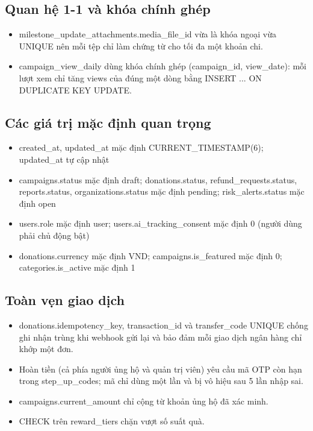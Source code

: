 \subsection{Quan hệ 1-1 và khóa chính ghép}

\begin{itemize}
    \item milestone\_\allowbreak{}update\_\allowbreak{}attachments.media\_\allowbreak{}file\_\allowbreak{}id vừa là khóa ngoại vừa UNIQUE nên mỗi tệp chỉ làm chứng từ cho tối đa một khoản chi.
    \item campaign\_\allowbreak{}view\_\allowbreak{}daily dùng khóa chính ghép (campaign\_\allowbreak{}id, view\_\allowbreak{}date): mỗi lượt xem chỉ tăng views của đúng một dòng bằng INSERT ... ON DUPLICATE KEY UPDATE.
\end{itemize}

\subsection{Các giá trị mặc định quan trọng}

\begin{itemize}
    \item created\_\allowbreak{}at, updated\_\allowbreak{}at mặc định CURRENT\_\allowbreak{}TIMESTAMP(6); updated\_\allowbreak{}at tự cập nhật
    \item campaigns.status mặc định draft; donations.status, refund\_\allowbreak{}requests.status, reports.status, organizations.status mặc định pending; risk\_\allowbreak{}alerts.status mặc định open
    \item users.role mặc định user; users.ai\_\allowbreak{}tracking\_\allowbreak{}consent mặc định 0 (người dùng phải chủ động bật)
    \item donations.currency mặc định VND; campaigns.is\_\allowbreak{}featured mặc định 0; categories.is\_\allowbreak{}active mặc định 1
\end{itemize}

\subsection{Toàn vẹn giao dịch}

\begin{itemize}
    \item donations.idempotency\_\allowbreak{}key, transaction\_\allowbreak{}id và transfer\_\allowbreak{}code UNIQUE chống ghi nhận trùng khi webhook gửi lại và bảo đảm mỗi giao dịch ngân hàng chỉ khớp một đơn.
    \item Hoàn tiền (cả phía người ủng hộ và quản trị viên) yêu cầu mã OTP còn hạn trong step\_\allowbreak{}up\_\allowbreak{}codes; mã chỉ dùng một lần và bị vô hiệu sau 5 lần nhập sai.
    \item campaigns.current\_\allowbreak{}amount chỉ cộng từ khoản ủng hộ đã xác minh.
    \item CHECK trên reward\_\allowbreak{}tiers chặn vượt số suất quà.
\end{itemize}

